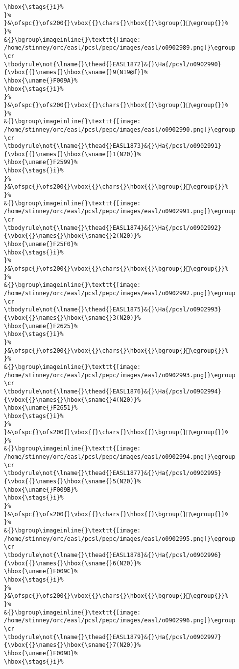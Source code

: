 \begin{verbatim}
\hbox{\stags{}i}%
}%
}&\ofspc{}\ofs200{}\vbox{{}\chars{}\hbox{{}\bgroup{}󰂙\egroup{}}%
}%
&{}\bgroup\imageinline{}\texttt{[image: /home/stinney/orc/easl/pcsl/pepc/images/easl/o0902989.png]}\egroup
\cr
\tbodyrule\not{\lname{}\thead{}EASL1872}&{}\Ha{/pcsl/o0902990}{\vbox{{}\names{}\hbox{\sname{}9(N19@f)}%
\hbox{\uname{}F009A}%
\hbox{\stags{}i}%
}%
}&\ofspc{}\ofs200{}\vbox{{}\chars{}\hbox{{}\bgroup{}󰂚\egroup{}}%
}%
&{}\bgroup\imageinline{}\texttt{[image: /home/stinney/orc/easl/pcsl/pepc/images/easl/o0902990.png]}\egroup
\cr
\tbodyrule\not{\lname{}\thead{}EASL1873}&{}\Ha{/pcsl/o0902991}{\vbox{{}\names{}\hbox{\sname{}1(N20)}%
\hbox{\uname{}F2599}%
\hbox{\stags{}i}%
}%
}&\ofspc{}\ofs200{}\vbox{{}\chars{}\hbox{{}\bgroup{}󲖙\egroup{}}%
}%
&{}\bgroup\imageinline{}\texttt{[image: /home/stinney/orc/easl/pcsl/pepc/images/easl/o0902991.png]}\egroup
\cr
\tbodyrule\not{\lname{}\thead{}EASL1874}&{}\Ha{/pcsl/o0902992}{\vbox{{}\names{}\hbox{\sname{}2(N20)}%
\hbox{\uname{}F25F0}%
\hbox{\stags{}i}%
}%
}&\ofspc{}\ofs200{}\vbox{{}\chars{}\hbox{{}\bgroup{}󲗰\egroup{}}%
}%
&{}\bgroup\imageinline{}\texttt{[image: /home/stinney/orc/easl/pcsl/pepc/images/easl/o0902992.png]}\egroup
\cr
\tbodyrule\not{\lname{}\thead{}EASL1875}&{}\Ha{/pcsl/o0902993}{\vbox{{}\names{}\hbox{\sname{}3(N20)}%
\hbox{\uname{}F2625}%
\hbox{\stags{}i}%
}%
}&\ofspc{}\ofs200{}\vbox{{}\chars{}\hbox{{}\bgroup{}󲘥\egroup{}}%
}%
&{}\bgroup\imageinline{}\texttt{[image: /home/stinney/orc/easl/pcsl/pepc/images/easl/o0902993.png]}\egroup
\cr
\tbodyrule\not{\lname{}\thead{}EASL1876}&{}\Ha{/pcsl/o0902994}{\vbox{{}\names{}\hbox{\sname{}4(N20)}%
\hbox{\uname{}F2651}%
\hbox{\stags{}i}%
}%
}&\ofspc{}\ofs200{}\vbox{{}\chars{}\hbox{{}\bgroup{}󲙑\egroup{}}%
}%
&{}\bgroup\imageinline{}\texttt{[image: /home/stinney/orc/easl/pcsl/pepc/images/easl/o0902994.png]}\egroup
\cr
\tbodyrule\not{\lname{}\thead{}EASL1877}&{}\Ha{/pcsl/o0902995}{\vbox{{}\names{}\hbox{\sname{}5(N20)}%
\hbox{\uname{}F009B}%
\hbox{\stags{}i}%
}%
}&\ofspc{}\ofs200{}\vbox{{}\chars{}\hbox{{}\bgroup{}󰂛\egroup{}}%
}%
&{}\bgroup\imageinline{}\texttt{[image: /home/stinney/orc/easl/pcsl/pepc/images/easl/o0902995.png]}\egroup
\cr
\tbodyrule\not{\lname{}\thead{}EASL1878}&{}\Ha{/pcsl/o0902996}{\vbox{{}\names{}\hbox{\sname{}6(N20)}%
\hbox{\uname{}F009C}%
\hbox{\stags{}i}%
}%
}&\ofspc{}\ofs200{}\vbox{{}\chars{}\hbox{{}\bgroup{}󰂜\egroup{}}%
}%
&{}\bgroup\imageinline{}\texttt{[image: /home/stinney/orc/easl/pcsl/pepc/images/easl/o0902996.png]}\egroup
\cr
\tbodyrule\not{\lname{}\thead{}EASL1879}&{}\Ha{/pcsl/o0902997}{\vbox{{}\names{}\hbox{\sname{}7(N20)}%
\hbox{\uname{}F009D}%
\hbox{\stags{}i}%

\end{verbatim}
